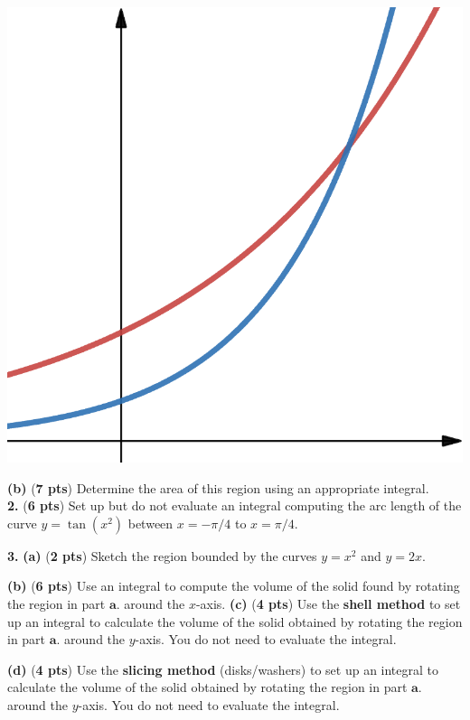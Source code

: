 \documentclass[12pt]{article}
\renewcommand{\emph}[1]{\textsf{\textbf{#1}}}
\newcommand{\prob}[1]{\bigskip\noindent\textbf{#1.} }
\newcommand{\pts}[1]{(\emph{#1 pts})}
\newcommand{\probpts}[2]{\prob{#1} \pts{#2} \quad}
\newcommand{\ppartpts}[2]{\textbf{(#1)} \pts{#2} \quad}
\newcommand{\epartpts}[2]{\medskip\noindent \textbf{(#1)} \pts{#2} \quad}
\begin{document}
\includegraphics[scale=0.2]{m1p1.png}

\epartpts{b}{7} Determine the area of this region using an appropriate integral. \\

\vfill
\probpts{2}{6} Set up but do not evaluate an integral computing the arc length of the curve $y=\tan(x^2)$ between $x=-\pi/4$ to $x=\pi/4$.\\
\vspace{1.5in}

\newpage
\prob{3}\ppartpts{a}{2} Sketch the region bounded by the curves $y=x^2$ and $y=2x.$
\vspace{2in}

\epartpts{b}{6} Use an integral to compute the volume of the solid found by rotating the region in part $\textbf{a.}$ around the $x$-axis.
\vfill
\epartpts{c}{4} Use the \emph{shell method} to set up an integral to calculate the volume of the solid obtained by rotating the region in part $\textbf{a.}$ around the $y$-axis. You do not need to evaluate the integral.

\vspace{1.3in}

\epartpts{d}{4} Use the \emph{slicing method} (disks/washers) to set up an integral to calculate the volume of the solid obtained by rotating the region in part $\textbf{a.}$ around the $y$-axis. You do not need to evaluate the integral.
\end{document}
